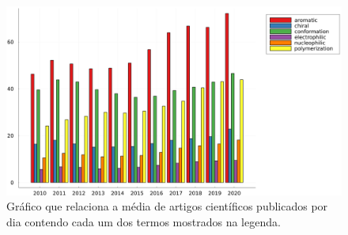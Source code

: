 \begin{figure}[htb]
	\caption{\label{fig:3} Gráfico que relaciona a média de artigos científicos publicados por dia contendo cada um dos termos mostrados na legenda.}
	\begin{center}
		\includegraphics[width=1.0\textwidth]{images/fig3.png}
	\end{center}
\end{figure}




